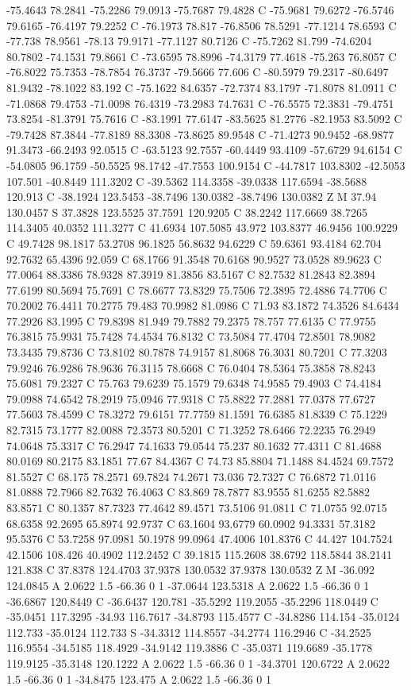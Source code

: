 {{{-75.4643 78.2841 -75.2286 79.0913 -75.7687 79.4828 C -75.9681 79.6272 -76.5746 79.6165 -76.4197 79.2252 C -76.1973 78.817 -76.8506 78.5291 -77.1214 78.6593 C -77.738 78.9561 -78.13 79.9171 -77.1127 80.7126 C -75.7262 81.799 -74.6204 80.7802 -74.1531 79.8661 C -73.6595 78.8996 -74.3179 77.4618 -75.263 76.8057 C -76.8022 75.7353 -78.7854 76.3737 -79.5666 77.606 C -80.5979 79.2317 -80.6497 81.9432 -78.1022 83.192 C -75.1622 84.6357 -72.7374 83.1797 -71.8078 81.0911 C -71.0868 79.4753 -71.0098 76.4319 -73.2983 74.7631 C -76.5575 72.3831 -79.4751 73.8254 -81.3791 75.7616 C -83.1991 77.6147 -83.5625 81.2776 -82.1953 83.5092 C -79.7428 87.3844 -77.8189 88.3308 -73.8625 89.9548 C -71.4273 90.9452 -68.9877 91.3473 -66.2493 92.0515 C -63.5123 92.7557 -60.4449 93.4109 -57.6729 94.6154 C -54.0805 96.1759 -50.5525 98.1742 -47.7553 100.9154 C -44.7817 103.8302 -42.5053 107.501 -40.8449 111.3202 C -39.5362 114.3358 -39.0338 117.6594 -38.5688 120.913 C -38.1924 123.5453 -38.7496 130.0382 -38.7496 130.0382 Z M 37.94 130.0457 S 37.3828 123.5525 37.7591 120.9205 C 38.2242 117.6669 38.7265 114.3405 40.0352 111.3277 C 41.6934 107.5085 43.972 103.8377 46.9456 100.9229 C 49.7428 98.1817 53.2708 96.1825 56.8632 94.6229 C 59.6361 93.4184 62.704 92.7632 65.4396 92.059 C 68.1766 91.3548 70.6168 90.9527 73.0528 89.9623 C 77.0064 88.3386 78.9328 87.3919 81.3856 83.5167 C 82.7532 81.2843 82.3894 77.6199 80.5694 75.7691 C 78.6677 73.8329 75.7506 72.3895 72.4886 74.7706 C 70.2002 76.4411 70.2775 79.483 70.9982 81.0986 C 71.93 83.1872 74.3526 84.6434 77.2926 83.1995 C 79.8398 81.949 79.7882 79.2375 78.757 77.6135 C 77.9755 76.3815 75.9931 75.7428 74.4534 76.8132 C 73.5084 77.4704 72.8501 78.9082 73.3435 79.8736 C 73.8102 80.7878 74.9157 81.8068 76.3031 80.7201 C 77.3203 79.9246 76.9286 78.9636 76.3115 78.6668 C 76.0404 78.5364 75.3858 78.8243 75.6081 79.2327 C 75.763 79.6239 75.1579 79.6348 74.9585 79.4903 C 74.4184 79.0988 74.6542 78.2919 75.0946 77.9318 C 75.8822 77.2881 77.0378 77.6727 77.5603 78.4599 C 78.3272 79.6151 77.7759 81.1591 76.6385 81.8339 C 75.1229 82.7315 73.1777 82.0088 72.3573 80.5201 C 71.3252 78.6466 72.2235 76.2949 74.0648 75.3317 C 76.2947 74.1633 79.0544 75.237 80.1632 77.4311 C 81.4688 80.0169 80.2175 83.1851 77.67 84.4367 C 74.73 85.8804 71.1488 84.4524 69.7572 81.5527 C 68.175 78.2571 69.7824 74.2671 73.036 72.7327 C 76.6872 71.0116 81.0888 72.7966 82.7632 76.4063 C 83.869 78.7877 83.9555 81.6255 82.5882 83.8571 C 80.1357 87.7323 77.4642 89.4571 73.5106 91.0811 C 71.0755 92.0715 68.6358 92.2695 65.8974 92.9737 C 63.1604 93.6779 60.0902 94.3331 57.3182 95.5376 C 53.7258 97.0981 50.1978 99.0964 47.4006 101.8376 C 44.427 104.7524 42.1506 108.426 40.4902 112.2452 C 39.1815 115.2608 38.6792 118.5844 38.2141 121.838 C 37.8378 124.4703 37.9378 130.0532 37.9378 130.0532 Z M -36.092 124.0845 A 2.0622 1.5 -66.36 0 1 -37.0644 123.5318 A 2.0622 1.5 -66.36 0 1 -36.6867 120.8449 C -36.6437 120.781 -35.5292 119.2055 -35.2296 118.0449 C -35.0451 117.3295 -34.93 116.7617 -34.8793 115.4577 C -34.8286 114.154 -35.0124 112.733 -35.0124 112.733 S -34.3312 114.8557 -34.2774 116.2946 C -34.2525 116.9554 -34.5185 118.4929 -34.9142 119.3886 C -35.0371 119.6689 -35.1778 119.9125 -35.3148 120.1222 A 2.0622 1.5 -66.36 0 1 -34.3701 120.6722 A 2.0622 1.5 -66.36 0 1 -34.8475 123.475 A 2.0622 1.5 -66.36 0 1 }}}
